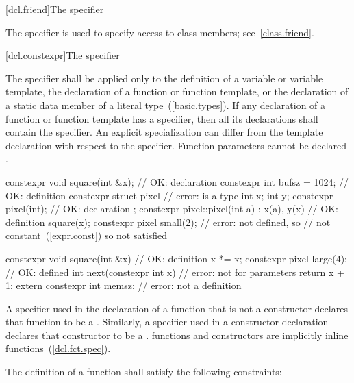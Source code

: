 [dcl.friend]{The  specifier}%

\pnum
The  specifier is used to specify access to class members;
see~\ref{class.friend}.

[dcl.constexpr]{The  specifier}%

\pnum
The  specifier shall be applied only to the definition of
a variable or variable template,
the declaration of a
function or function template, or the declaration of a static
data member of a literal type~(\ref{basic.types}).
If any declaration of a function or function template has
a  specifier,
then all its declarations shall contain the  specifier. \enternote An
explicit specialization can differ from the template declaration with respect to the
 specifier. \exitnote
\enternote
Function parameters cannot be declared .\exitnote
\enterexample
\begin{codeblock}
constexpr void square(int &x);  // OK: declaration
constexpr int bufsz = 1024;     // OK: definition
constexpr struct pixel {        // error:  is a type
  int x;
  int y;
  constexpr pixel(int);         // OK: declaration
}; 
constexpr pixel::pixel(int a)
  : x(a), y(x)                  // OK: definition
  { square(x); }
constexpr pixel small(2);       // error:  not defined, so 
                                // not constant~(\ref{expr.const}) so  not satisfied

constexpr void square(int &x) { // OK: definition
  x *= x;
}
constexpr pixel large(4);       // OK:  defined
int next(constexpr int x) {     // error: not for parameters
     return x + 1;
} 
extern constexpr int memsz;     // error: not a definition 
\end{codeblock}
\exitexample

\pnum
A  specifier used in the declaration of a function that is not a
constructor declares that
function to be a . Similarly, a
 specifier used in 
a constructor declaration declares that constructor to be a
.
 functions and  constructors are
implicitly inline functions~(\ref{dcl.fct.spec}).

\pnum
{}
The definition of a  function shall satisfy the following
constraints:

